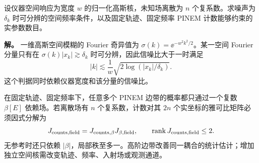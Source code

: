 \begin{workedexample}[高斯模糊与边带信息的秩]
设仪器空间响应为宽度 $w$ 的归一化高斯核，未知场离散为 $n$ 个复系数。求噪声为 $\delta_k$ 时可分辨的空间频率条件，以及固定轨迹、固定频率 PINEM 计数能够约束的实参数数目。

\textbf{解。} 一维高斯空间模糊的 Fourier 奇异值为 $\sigma(k)=\ee^{-w^2k^2/2}$。某一空间 Fourier 分量只有在 $\sigma(k)|x_k|\gtrsim\delta_k$ 时可分辨，因此信噪比大于一时满足
\[
|k|\lesssim\frac1w\sqrt{2\log(|x_k|/\delta_k)}.
\]
这个判据同时依赖仪器宽度和该分量的信噪比。

\begin{samepage}
在固定轨迹、固定频率下，任意多个 PINEM 边带的概率都只通过一个复数 $\beta[E]$ 依赖场。若离散场有 $n$ 个复系数，计数对其 $2n$ 个实坐标的雅可比矩阵必须因式分解为
\[
J_{\rm counts,field}=J_{\rm counts,\beta}J_{\beta,\rm field},
\qquad\operatorname{rank}J_{\rm counts,field}\le2.
\]
\begingroup{}
无参考时还只依赖 $|\beta|$，局部秩至多一。高阶边带改善同一耦合的统计估计；增加独立空间核需改变轨迹、频率、入射场或观测通道。\par
\endgroup
\end{samepage}
\end{workedexample}
